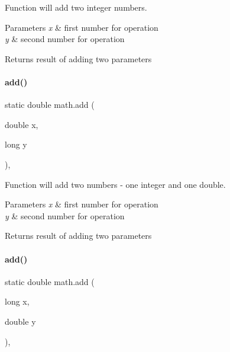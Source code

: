 Function will add two integer numbers. 


\begin{DoxyParams}{Parameters}
{\em x} & first number for operation \\
\hline
{\em y} & second number for operation \\
\hline
\end{DoxyParams}
\begin{DoxyReturn}{Returns}
result of adding two parameters 
\end{DoxyReturn}
\mbox{\label{classmath_a72d851503e310afe7d44b6c24e40aa7a}} 
\paragraph{\texorpdfstring{add()}{add()}\hspace{0.1cm}{\footnotesize\ttfamily [3/4]}}
{\footnotesize\ttfamily static double math.\+add (\begin{DoxyParamCaption}\item[{double}]{x,  }\item[{long}]{y }\end{DoxyParamCaption})\hspace{0.3cm}{\ttfamily [inline]}, {\ttfamily [static]}}



Function will add two numbers -\/ one integer and one double. 


\begin{DoxyParams}{Parameters}
{\em x} & first number for operation \\
\hline
{\em y} & second number for operation \\
\hline
\end{DoxyParams}
\begin{DoxyReturn}{Returns}
result of adding two parameters 
\end{DoxyReturn}
\mbox{\label{classmath_a2470ffa51c860423010e4550ee7caa4a}} 
\paragraph{\texorpdfstring{add()}{add()}\hspace{0.1cm}{\footnotesize\ttfamily [4/4]}}
{\footnotesize\ttfamily static double math.\+add (\begin{DoxyParamCaption}\item[{long}]{x,  }\item[{double}]{y }\end{DoxyParamCaption})\hspace{0.3cm}{\ttfamily [inline]}, {\ttfamily [static]}}



